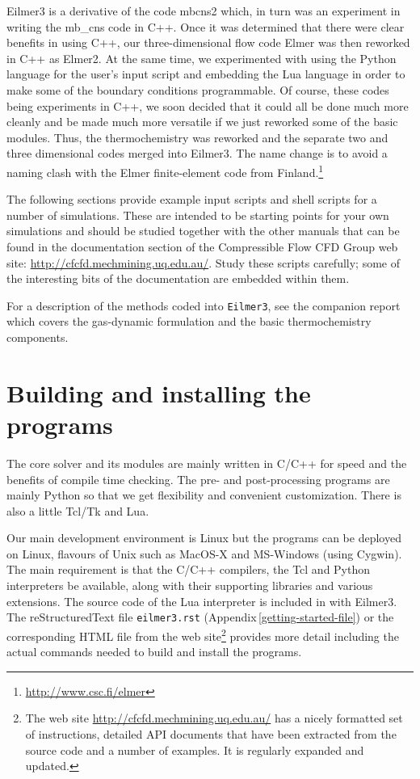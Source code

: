 \documentclass[12pt,a4paper,twoside]{article}
\begin{document}
\medskip
Eilmer3 is a derivative of the code mbcns2 which, in turn was an experiment in writing
the mb\_cns code in C++.
Once it was determined that there were clear benefits in using C++,
our three-dimensional flow code Elmer was then reworked in C++ as Elmer2.
At the same time, we experimented with using the Python language for the user's input script and 
embedding the Lua language in order to make some of the boundary conditions programmable.
Of course, these codes being experiments in C++, we soon decided that it could all be done
much more cleanly and be made much more versatile if we just reworked some of the basic modules.
Thus, the thermochemistry was reworked and the separate two and three dimensional codes merged
into Eilmer3.
The name change is to avoid a naming clash with the Elmer finite-element code 
from Finland.\footnote{\url{http://www.csc.fi/elmer}}

\medskip 
The following sections provide example input scripts and shell scripts for a number of simulations.
These are intended to be starting points for your own simulations and should be studied together with 
the other manuals that can be found in the documentation section of the 
Compressible Flow CFD Group web site:  
\url{http://cfcfd.mechmining.uq.edu.au/}.
Study these scripts carefully; some of the interesting bits of the documentation are
embedded within them.

\medskip
For a description of the methods coded into \texttt{Eilmer3}, see the companion report \cite{jacobs_etal_2010b}
which covers the gas-dynamic formulation and the basic thermochemistry components.

\clearpage
\section{Building and installing the programs}
%
The core solver and its modules are mainly written in C/C++ for speed and the benefits of compile time checking. 
The pre- and post-processing programs are mainly Python so that we get flexibility and convenient customization.
There is also a little Tcl/Tk and Lua.

\medskip
Our main development environment is Linux but the programs can be deployed on
Linux, flavours of Unix such as MacOS-X and MS-Windows (using Cygwin).
The main requirement is that the C/C++ compilers, the Tcl and Python
interpreters be available, along with their supporting libraries and 
various extensions. 
The source code of the Lua interpreter is included in with Eilmer3.
The reStructuredText file \texttt{eilmer3.rst} (Appendix\,\ref{getting-started-file}) 
or the corresponding HTML file from the web site\footnote{The web site 
\url{http://cfcfd.mechmining.uq.edu.au/} has a nicely formatted set of instructions,
detailed API documents that have been extracted from the source code and 
a number of examples.  It is regularly expanded and updated.}
provides more detail including 
the actual commands needed to build and install the programs.
\end{document}
